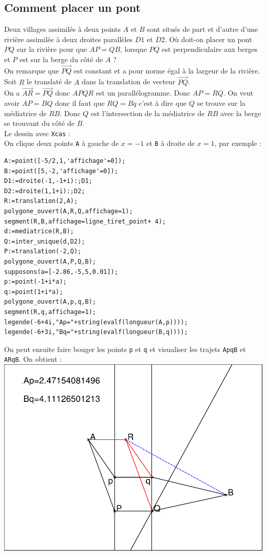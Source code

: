 \documentclass[a4paper,11pt]{book}
\begin{document}
\subsection{Comment placer un pont}
Deux villages assimil\'es \`a deux points $A$ et $B$ sont situ\'es de part et 
d'autre d'une rivi\`ere assimil\'ee \`a deux droites parall\`eles $D1$ et $D2$.
O\`u doit-on placer un pont $PQ$ sur la rivi\`ere pour que $AP=QB$, lorsque $PQ$
est perpendiculaire aux berges et $P$ est sur la berge du c\^ot\'e de $A$ ?\\
On remarque que $\overrightarrow{PQ}$ est constant et a pour norme
\'egal \`a la largeur de la rivi\`ere. Soit $R$ le translat\'e de $A$ dans la translation de vecteur $\overrightarrow{PQ}$. \\
On a $\overrightarrow{AR}=\overrightarrow{PQ}$ donc $APQR$ est un 
parall\'elogramme. 
Donc $AP=RQ$. On veut avoir $AP=BQ$ donc il faut que $RQ=Bq$ c'est \`a dire que $Q$ se trouve sur la m\'ediatrice de $RB$. Donc $Q$ est l'intersection de la 
m\'ediatrice de $RB$ avec la berge se trouvant du c\^ot\'e de $B$.\\
Le dessin avec {\tt Xcas} :\\
On clique deux points {\tt A} \`a gauche de $x=-1$ et {\tt B} \`a droite 
de $x=1$, par exemple :
\begin{verbatim}
A:=point([-5/2,1,'affichage'=0]);
B:=point([5,-2,'affichage'=0]);
D1:=droite(-1,-1+i):;D1;
D2:=droite(1,1+i):;D2;
R:=translation(2,A);
polygone_ouvert(A,R,Q,affichage=1);
segment(R,B,affichage=ligne_tiret_point+ 4);
d:=mediatrice(R,B);
Q:=inter_unique(d,D2);
P:=translation(-2,Q);
polygone_ouvert(A,P,Q,B);
supposons(a=[-2.86,-5,5,0.01]);
p:=point(-1+i*a);
q:=point(1+i*a);
polygone_ouvert(A,p,q,B);
segment(R,q,affichage=1);
legende(-6+4i,"Ap="+string(evalf(longueur(A,p))));
legende(-6+3i,"Bq="+string(evalf(longueur(B,q))));
\end{verbatim}
On peut ensuite faire bouger les points {\tt p} et {\tt q} et visualiser les 
trajets {\tt ApqB} et {\tt ARqB}.  
On obtient :\\
\includegraphics[width=\textwidth]{pont3}
\end{document}
